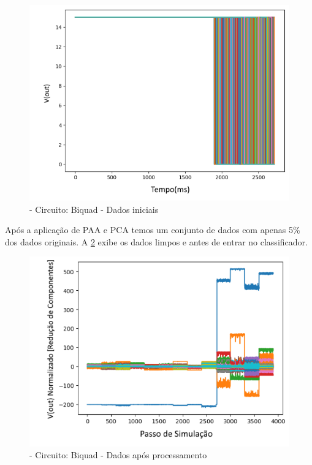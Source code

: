    \begin{figure}[H]
        \begin{center}
        \includegraphics[width=13cm]{./01_Pre_textuais/biquad_figs/dadosPreProc_Biquad_Highpass_Filter_mc_+_4bitPRBS_[FALHA]raw.png}
        \caption{\label{fig:dadobiinicial}- Circuito: Biquad - Dados iniciais}
        \end{center}
        \end{figure}
        
Após a aplicação de PAA e PCA temos um conjunto de dados com apenas 5\% dos dados originais. A \ref{fig:pcabi} exibe os dados limpos e antes de entrar no classificador.

 \begin{figure}[H]
        \begin{center}
        \includegraphics[width=13cm]{./01_Pre_textuais/biquad_figs/PCA_Biquad_Highpass_Filter_mc_+_4bitPRBS_[FALHA]raw.png}
        \caption{\label{fig:pcabi}- Circuito: Biquad - Dados após processamento}
        \end{center}
        \end{figure}
        
